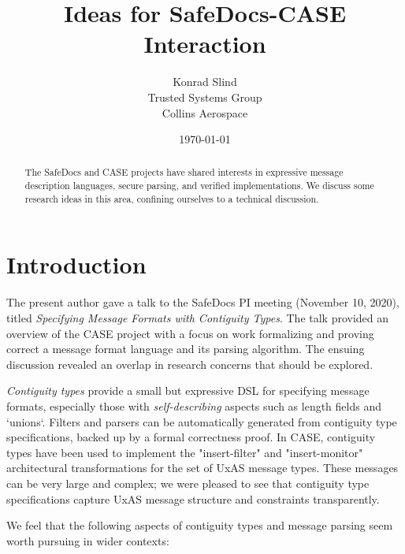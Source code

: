 \documentclass{article}
\begin{document}
\title{Ideas for SafeDocs-CASE Interaction}
\author{Konrad Slind \\ Trusted Systems Group \\ Collins Aerospace}
\date{\today}

\begin{abstract}
The SafeDocs and CASE projects have shared interests in expressive
message description languages, secure parsing, and verified
implementations. We discuss some research ideas in this area,
confining ourselves to a technical discussion.
\end{abstract}

\maketitle

\section*{Introduction}

The present author gave a talk to the SafeDocs PI meeting (November
10, 2020), titled \emph{Specifying Message Formats with Contiguity
  Types}. The talk provided an overview of the CASE project with a
focus on work formalizing and proving correct a message format
language and its parsing algorithm. The ensuing discussion revealed an
overlap in research concerns that should be explored.

\emph{Contiguity types} provide a small but expressive DSL for
specifying message formats, especially those with \emph{self-describing}
aspects such as length fields and `unions`. Filters and parsers
can be automatically generated from contiguity type specifications,
backed up by a formal correctness proof. In CASE, contiguity types
have been used to implement the "insert-filter" and "insert-monitor"
architectural transformations for the set of UxAS message types. These
messages can be very large and complex; we were pleased to see that
contiguity type specifications capture UxAS message structure and
constraints transparently.

We feel that the following aspects of contiguity types and message
parsing seem worth pursuing in wider contexts:
\end{document}
